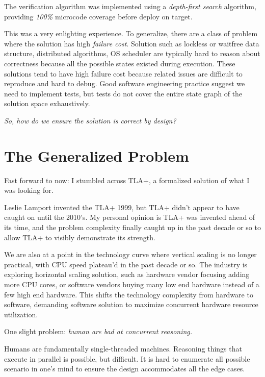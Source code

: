 \documentclass{report}
\begin{document}
The verification algorithm was implemented using a \textit{depth-first search}
algorithm, providing \textit{100\%} microcode coverage before deploy on
target.\newline

This was a very enlighting experience. To generalize, there are a class of
problem where the solution has high \textit{failure cost}. Solution such as
lockless or waitfree data structure, distributed algorithms, OS scheduler are
typically hard to reason about correctness because all the possible states
existed during execution. These solutions tend to have high failure cost because
related issues are difficult to reproduce and hard to debug. Good software
engineering practice suggest we need to implement tests, but tests do not cover
the entire state graph of the solution space exhaustively.\newline 

\textit{So, how do we ensure the solution is correct by design?}

\section{The Generalized Problem}

Fast forward to now: I stumbled across TLA+, a formalized solution of what I was
looking for.\newline

Leslie Lamport invented the TLA+ 1999, but TLA+ didn't appear to have caught on
until the 2010's. My personal opinion is TLA+ was invented ahead of its time,
and the problem complexity finally caught up in the past decade or so to allow
TLA+ to visibly demonstrate its strength.\newline

We are also at a point in the technology curve where vertical scaling is no
longer practical, with CPU speed plateau'd in the past decade or so. The
industry is exploring horizontal scaling solution, such as hardware vendor
focusing adding more CPU cores, or software vendors buying many low end hardware
instead of a few high end hardware. This shifts the technology complexity from
hardware to software, demanding software solution to maximize concurrent
hardware resource utilization. \newline

One slight problem: \textit{human are bad at concurrent reasoning.}\newline

Humans are fundamentally single-threaded machines. Reasoning things that execute
in parallel is possible, but difficult. It is hard to enumerate all possible
scenario in one's mind to ensure the design accommodates all the edge cases. 
\newline
\end{document}
